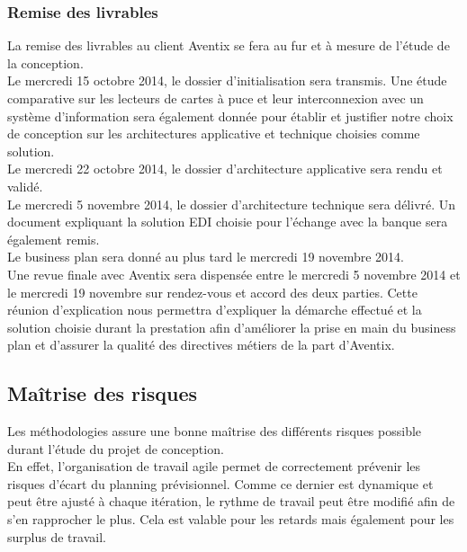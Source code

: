 \documentclass[11pt, a4paper]{article}
\begin{document}
\subsubsection{Remise des livrables}
La remise des livrables au client Aventix se fera au fur et à mesure de l'étude
de la conception. \\

Le mercredi 15 octobre 2014, le dossier d'initialisation sera transmis.
Une étude comparative sur les lecteurs de cartes à puce et leur interconnexion
avec un système d'information sera également donnée pour établir et justifier
notre choix de conception sur les architectures applicative et technique
choisies comme solution. \\

Le mercredi 22 octobre 2014, le dossier d'architecture applicative sera rendu
et validé. \\

Le mercredi 5 novembre 2014, le dossier d'architecture technique sera délivré.
Un document expliquant la solution EDI choisie pour l'échange avec la banque
sera également remis. \\

Le business plan sera donné au plus tard le mercredi 19 novembre 2014. \\

Une revue finale avec Aventix sera dispensée entre le mercredi 5 novembre 2014
et le mercredi 19 novembre sur rendez-vous et accord des deux parties.
Cette réunion d'explication nous permettra d'expliquer la démarche effectué et
la solution choisie durant la prestation afin d'améliorer la prise en main du
business plan et d'assurer la qualité des directives métiers de la part
d'Aventix. \\

\subsection{Maîtrise des risques}
Les méthodologies assure une bonne maîtrise des différents risques possible
durant l'étude du projet de conception. \\

En effet, l'organisation de travail agile permet de correctement prévenir les
risques d'écart du planning prévisionnel. Comme ce dernier est dynamique et
peut être ajusté à chaque itération, le rythme de travail peut être modifié
afin de s'en rapprocher le plus. Cela est valable pour les retards mais
également pour les surplus de travail. \\
\end{document}
